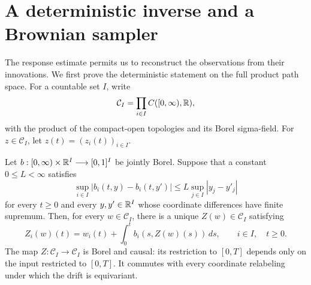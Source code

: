 \section{A deterministic inverse and a Brownian sampler}
\label{sec:decoder}

The response estimate permits us to reconstruct the observations from their
innovations.  We first prove the deterministic statement on the full product
path space.  For a countable set $I$, write
\[
 \mathcal C_I=\prod_{i\in I}C([0,\infty),\mathbb R),
\]
with the product of the compact-open topologies and its Borel sigma-field.
For $z\in\mathcal C_I$, let $z(t)=(z_i(t))_{i\in I}$.

\begin{lemma}\label{lem:inverse}
Let $b:[0,\infty)\times\mathbb R^I\longrightarrow[0,1]^I$ be jointly Borel.
Suppose that a constant $0\le L<\infty$ satisfies
\begin{equation}\label{eq:abstract-lipschitz}
 \sup_{i\in I}|b_i(t,y)-b_i(t,y')|
 \le L\sup_{j\in I}|y_j-y'_j|
\end{equation}
for every $t\ge0$ and every $y,y'\in\mathbb R^I$ whose coordinate differences
have finite supremum.  Then, for every $w\in\mathcal C_I$, there is a
unique $Z(w)\in\mathcal C_I$ satisfying
\begin{equation}\label{eq:inverse-equation}
 Z_i(w)(t)=w_i(t)+\int_0^t b_i(s,Z(w)(s))\,ds,
 \qquad i\in I,\quad t\ge0.
\end{equation}
The map $Z:\mathcal C_I\longrightarrow\mathcal C_I$ is Borel and
causal: its restriction to $[0,T]$ depends only on the input restricted
to $[0,T]$.  It commutes with every coordinate relabeling under which
the drift is equivariant.
\end{lemma}

